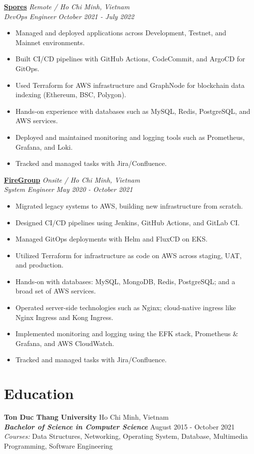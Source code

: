 \documentclass[11pt, a4paper]{article}
\begin{document}
\vspace{0.5em}
\textbf{\href{https://spores.app/}{Spores}} \hfill {\small\textit{Remote / Ho Chi Minh, Vietnam}} \\
\textit{DevOps Engineer} \hfill {\small\textit{October 2021 - July 2022}}
\begin{itemize}[leftmargin=*]
    \item Managed and deployed applications across Development, Testnet, and Mainnet environments.
    \item Built CI/CD pipelines with GitHub Actions, CodeCommit, and ArgoCD for GitOps.
    \item Used Terraform for AWS infrastructure and Graph\-Node for block\-chain data in\-dex\-ing (Ethereum, BSC, Polygon).
    \item Hands-on experience with databases such as MySQL, Redis, PostgreSQL, and AWS services.
    \item Deployed and maintained monitoring and logging tools such as Prometheus, Grafana, and Loki.
    \item Tracked and managed tasks with Jira/Confluence.
\end{itemize}

\vspace{0.5em}
\textbf{\href{https://firegroup.io/}{FireGroup}} \hfill {\small\textit{Onsite / Ho Chi Minh, Vietnam}} \\
\textit{System Engineer} \hfill {\small\textit{May 2020 - October 2021}}
\begin{itemize}[leftmargin=*]
    \item Migrated legacy systems to AWS, building new infrastructure from scratch.
    \item Designed CI/CD pipelines using Jenkins, GitHub Actions, and GitLab CI.
    \item Managed GitOps deployments with Helm and FluxCD on EKS.
    \item Utilized Terraform for infrastructure as code on AWS across staging, UAT, and production.
    \item Hands-on with databases: MySQL, MongoDB, Redis, PostgreSQL; and a broad set of AWS services.
    \item Operated server-side technologies such as Nginx; cloud-native ingress like Nginx Ingress and Kong Ingress.
    \item Implemented monitoring and logging using the EFK stack, Prometheus \& Grafana, and AWS CloudWatch.
    \item Tracked and managed tasks with Jira/Confluence.
\end{itemize}


\section{Education}
\textbf{Ton Duc Thang University} \hfill Ho Chi Minh, Vietnam \\
\textit{\textbf{Bachelor of Science in Computer Science}} \hfill August 2015 - October 2021 \\
\textit{Courses:} Data Structures, Networking, Operating System, Database, Multimedia Programming, Software Engineering
\end{document}
